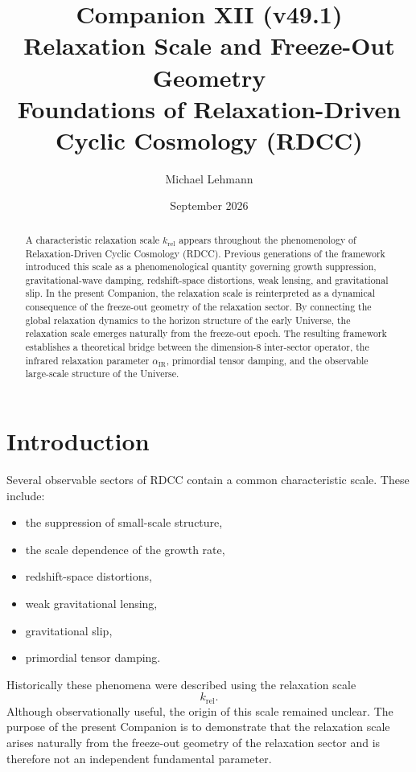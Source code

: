 \documentclass[11pt,a4paper]{article}
\title{\textbf{Companion XII (v49.1)}\\[0.2cm]
\textbf{Relaxation Scale and Freeze-Out Geometry}\\[0.2cm]
\large Foundations of Relaxation-Driven Cyclic Cosmology (RDCC)}
\author[1]{Michael Lehmann}
\affil[1]{\small Independent Researcher, Relaxation-Driven Cyclic Cosmology (RDCC)\\
\texttt{mi.lehmann@gmx.de}}
\date{September 2026}
\begin{document}
\maketitle

\begin{abstract}
A characteristic relaxation scale \(k_{\mathrm{rel}}\) appears throughout the
phenomenology of Relaxation-Driven Cyclic Cosmology (RDCC). Previous generations
of the framework introduced this scale as a phenomenological quantity governing
growth suppression, gravitational-wave damping, redshift-space distortions, weak
lensing, and gravitational slip. In the present Companion, the relaxation scale
is reinterpreted as a dynamical consequence of the freeze-out geometry of the
relaxation sector. By connecting the global relaxation dynamics to the horizon
structure of the early Universe, the relaxation scale emerges naturally from the
freeze-out epoch. The resulting framework establishes a theoretical bridge
between the dimension-8 inter-sector operator, the infrared relaxation parameter
\(\alpha_{\mathrm{IR}}\), primordial tensor damping, and the observable
large-scale structure of the Universe.
\end{abstract}

\tableofcontents
\newpage

\section{Introduction}

Several observable sectors of RDCC contain a common characteristic scale. These
include:
\begin{itemize}
  \item the suppression of small-scale structure,
  \item the scale dependence of the growth rate,
  \item redshift-space distortions,
  \item weak gravitational lensing,
  \item gravitational slip,
  \item primordial tensor damping.
\end{itemize}

Historically these phenomena were described using the relaxation scale
\begin{equation}
  k_{\mathrm{rel}}.
\end{equation}
Although observationally useful, the origin of this scale remained unclear. The
purpose of the present Companion is to demonstrate that the relaxation scale
arises naturally from the freeze-out geometry of the relaxation sector and is
therefore not an independent fundamental parameter.
\end{document}
